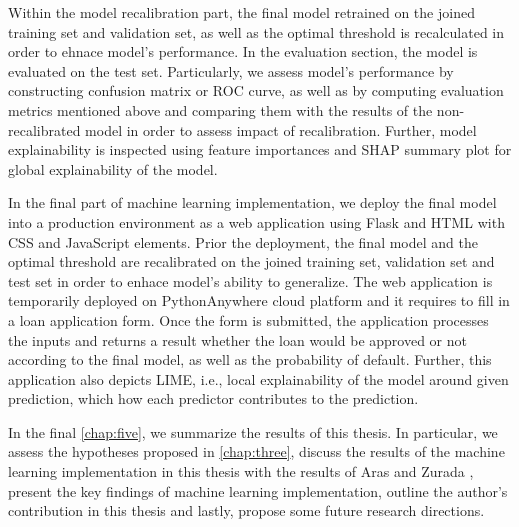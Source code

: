 Within the model recalibration part, the final model retrained on the joined training set and validation set, as well as the optimal threshold is recalculated in order to ehnace model's performance.
In the evaluation section, the model is evaluated on the test set. Particularly, we assess model's performance by constructing confusion matrix or ROC curve, as well as by computing evaluation metrics mentioned above and comparing them with the results of the non-recalibrated model in order to assess impact of recalibration. Further, model explainability is inspected using feature importances and SHAP summary plot for global explainability of the model.

In the final part of machine learning implementation, we deploy the final model into a production environment as a web application using Flask and HTML with CSS and JavaScript elements. Prior the deployment, the final model and the optimal threshold are recalibrated on the joined training set, validation set and test set in order to enhace model's ability to generalize. 
The web application is temporarily deployed on PythonAnywhere cloud platform and it requires to fill in a loan application form. Once the form is submitted, the application processes the inputs and returns a result whether the loan would be approved or not according to the final model, as well as the probability of default. Further, this application also depicts LIME, i.e., local explainability of the model around given prediction, which how each predictor contributes to the prediction.

In the final \autoref{chap:five}, we summarize the results of this thesis. In particular, we assess the hypotheses proposed in \autoref{chap:three}, discuss the results of the machine learning implementation in this thesis with the results of Aras \citep{serkan2021bagging} and Zurada \citep{zurada2014classification}, present the key findings of machine learning implementation, outline the author's contribution in this thesis and lastly, propose some future research directions.

